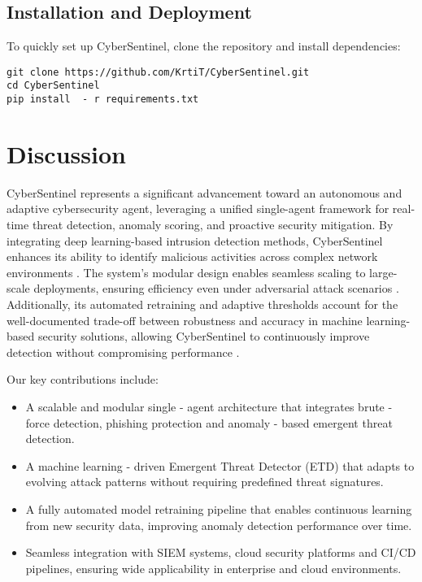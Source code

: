 \documentclass{article}
\begin{document}
\subsection{Installation and Deployment}

To quickly set up CyberSentinel, clone the repository and install dependencies:
\begin{verbatim}
git clone https://github.com/KrtiT/CyberSentinel.git
cd CyberSentinel
pip install  - r requirements.txt
\end{verbatim}

\section{Discussion}

CyberSentinel represents a significant advancement toward an autonomous and adaptive cybersecurity agent, leveraging a unified single-agent framework for real-time threat detection, anomaly scoring, and proactive security mitigation. By integrating deep learning-based intrusion detection methods, CyberSentinel enhances its ability to identify malicious activities across complex network environments \cite{li2020deep}. The system's modular design enables seamless scaling to large-scale deployments, ensuring efficiency even under adversarial attack scenarios \cite{kurakin2018adversarial}. Additionally, its automated retraining and adaptive thresholds account for the well-documented trade-off between robustness and accuracy in machine learning-based security solutions, allowing CyberSentinel to continuously improve detection without compromising performance \cite{zhang2019theoretically}.

Our key contributions include:
\begin{itemize}
    \item A scalable and modular single - agent architecture that integrates brute - force detection, phishing protection and anomaly - based emergent threat detection.
    \item A machine learning - driven Emergent Threat Detector (ETD) that adapts to evolving attack patterns without requiring predefined threat signatures.
    \item A fully automated model retraining pipeline that enables continuous learning from new security data, improving anomaly detection performance over time.
    \item Seamless integration with SIEM systems, cloud security platforms and CI/CD pipelines, ensuring wide applicability in enterprise and cloud environments.
\end{itemize}
\end{document}
